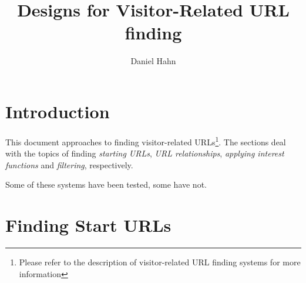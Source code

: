 \documentclass[a4paper]{danarticle}
\begin{document}
  \author{Daniel Hahn}
  \title{Designs for Visitor-Related URL finding}
  \maketitle
  
  \section*{Introduction}
    This document approaches to finding visitor-related URLs\footnote{Please
    refer to the description of visitor-related URL finding systems for 
    more information}. The sections deal with the topics of
    finding \textit{starting URLs}, \textit{URL relationships}, \textit{applying
    interest functions} and \textit{filtering}, respectively.
    
    Some of these systems have been tested, some have not.
    \section*{Finding Start URLs}
\end{document}
